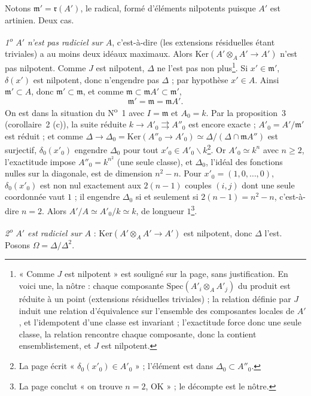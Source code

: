 \documentclass[11pt,a4paper]{article}
\begin{document}
Notons $\mathfrak{m}' = \mathfrak{r}(A')$, le radical, formé d'éléments
nilpotents puisque $A'$ est artinien. Deux cas.

\emph{1\textsuperscript{o} $A'$ n'est pas radiciel sur $A$}, c'est-à-dire
(les extensions résiduelles étant triviales) a au moins deux idéaux maximaux.
Alors $\mathrm{Ker}(A' \otimes_A A' \to A')$ n'est pas nilpotent. Comme $J$
est nilpotent, $\Delta$ ne l'est pas non plus\footnote{« Comme $J$ est
nilpotent » est souligné sur la page, sans justification. En voici une, la
nôtre : chaque composante $\mathrm{Spec}(A'_i \otimes_A A'_j)$ du produit
est réduite à un point (extensions résiduelles triviales) ; la relation
définie par $J$ induit une relation d'équivalence sur l'ensemble des
composantes locales de $A'$, et l'idempotent d'une classe est invariant ;
l'exactitude force donc une seule classe, la relation rencontre chaque
composante, donc la contient ensemblistement, et $J$ est nilpotent.}. Si
$x' \in \mathfrak{m}'$, $\delta(x')$ est nilpotent, donc n'engendre pas
$\Delta$ ; par hypothèse $x' \in A$. Ainsi $\mathfrak{m}' \subset A$, donc
$\mathfrak{m}' \subset \mathfrak{m}$, et comme $\mathfrak{m} \subset
\mathfrak{m}A' \subset \mathfrak{m}'$,
\[
  \mathfrak{m}' = \mathfrak{m} = \mathfrak{m}A' .
\]
On est dans la situation du N\textsuperscript{o}~1 avec $I = \mathfrak{m}$ et
$A_0 = k$. Par la proposition~3 (corollaire~2 (c)), la suite réduite $k \to
A'_0 \rightrightarrows A''_0$ est encore exacte ; $A'_0 = A'/\mathfrak{m}'$ est
réduit ; et comme $\Delta \to \Delta_0 = \mathrm{Ker}(A''_0 \to A'_0) \simeq
\Delta/(\Delta \cap \mathfrak{m}A'')$ est surjectif, $\delta_0(x'_0)$ engendre
$\Delta_0$ pour tout $x'_0 \in A'_0 \smallsetminus k$\footnote{La page écrit
« $\delta_0(x'_0) \in A'_0$ » ; l'élément est dans $\Delta_0 \subset
A''_0$.}. Or $A'_0 \simeq k^n$ avec $n \geqslant 2$, l'exactitude impose
$A''_0 = k^{n^2}$ (une seule classe), et $\Delta_0$, l'idéal des fonctions
nulles sur la diagonale, est de dimension $n^2 - n$. Pour $x'_0 = (1, 0,
\ldots, 0)$, $\delta_0(x'_0)$ est non nul exactement aux $2(n-1)$ couples
$(i, j)$ dont une seule coordonnée vaut $1$ ; il engendre $\Delta_0$ si et
seulement si $2(n-1) = n^2 - n$, c'est-à-dire $n = 2$. Alors $A'/A \simeq
A'_0/k \simeq k$, de longueur $1$\footnote{La page conclut « on trouve $n =
2$, OK » ; le décompte est le nôtre.}.

\emph{2\textsuperscript{o} $A'$ est radiciel sur $A$} : $\mathrm{Ker}(A'
\otimes_A A' \to A')$ est nilpotent, donc $\Delta$ l'est. Posons $\Omega =
\Delta/\Delta^2$.
\end{document}
